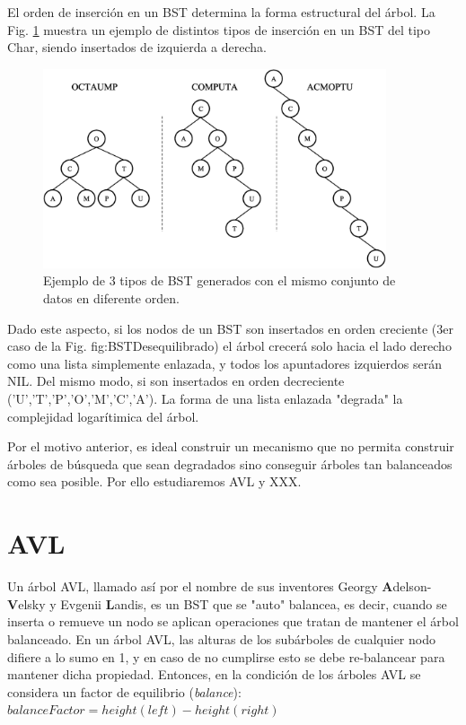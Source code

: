 El orden de inserción en un BST determina la forma estructural del árbol. La Fig. \ref{fig:BSTDesequilibrado} muestra un ejemplo de distintos tipos de inserción en un BST del tipo Char, siendo insertados de izquierda a derecha.

\begin{figure}[htpb!]
  \begin{center}
    \includegraphics[width=0.9\textwidth]{images/BSTDesequilibrado.eps}
  \end{center}
  \caption{Ejemplo de 3 tipos de BST generados con el mismo conjunto de datos en diferente orden.}
  \label{fig:BSTDesequilibrado}
\end{figure}

Dado este aspecto, si los nodos de un BST son insertados en orden creciente (3er caso de la Fig. {fig:BSTDesequilibrado}) el árbol crecerá solo hacia el lado derecho como una lista simplemente enlazada, y todos los apuntadores izquierdos serán NIL. Del mismo modo, si son insertados en orden decreciente ('U','T','P','O','M','C','A'). La forma de una lista enlazada "degrada" la complejidad logarítimica del árbol.

Por el motivo anterior, es ideal construir un mecanismo que no permita construir árboles de búsqueda que sean degradados sino conseguir árboles tan balanceados como sea posible. Por ello estudiaremos AVL y XXX.

\section{AVL}

Un árbol AVL, llamado así por el nombre de sus inventores Georgy \textbf{A}delson-\textbf{V}elsky y Evgenii \textbf{L}andis, es un BST que se "auto" balancea, es decir, cuando se inserta o remueve un nodo se aplican operaciones que tratan de mantener el árbol balanceado. En un árbol AVL, las alturas de los subárboles de cualquier nodo difiere a lo sumo en 1, y en caso de no cumplirse esto se debe re-balancear para mantener dicha propiedad. Entonces, en la condición de los árboles AVL se considera un factor de equilibrio (\textit{balance}):
$balanceFactor = height(left) - height(right)$

